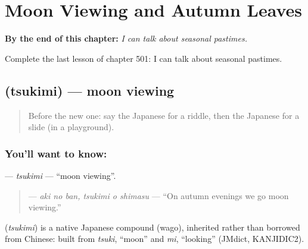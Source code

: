 
\chapter{Moon Viewing and Autumn Leaves}
\label{ch:ja-moon-viewing-and-autumn-leaves}

\begin{chapteropening}
\textbf{By the end of this chapter:} \emph{I can talk about seasonal pastimes.}

Complete the last lesson of chapter 501: I can talk about seasonal pastimes.
\end{chapteropening}

\section[\texorpdfstring{\ja{つきみ} (tsukimi)}{つきみ (tsukimi)}]{ (tsukimi) — moon viewing}

\label{lesson:JA-C501-tsukimi}



\begin{quote}
Before the new one: say the Japanese for a riddle, then the Japanese for a slide (in a playground).
\end{quote}

\subsection*{You'll want to know: }
\textbf{} — \emph{tsukimi} — \textquotedblleft{}moon viewing\textquotedblright{}.

\begin{quote}
\textbf{  } — \emph{aki no ban, tsukimi o shimasu} — \textquotedblleft{}On autumn evenings we go moon viewing.\textquotedblright{}
\end{quote}

\begin{cousinweb}
\textbf{} (\emph{tsukimi}) is a native Japanese compound (wago), inherited rather than borrowed from Chinese: built from \emph{tsuki}, \textquotedblleft{}moon\textquotedblright{} and \emph{mi}, \textquotedblleft{}looking\textquotedblright{} (JMdict, KANJIDIC2).
\end{cousinweb}


